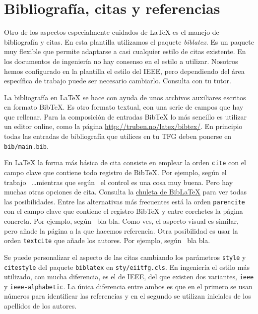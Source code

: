 \section{Bibliografía, citas y referencias} 
\label{sec:bibliografia-citas}

Otro de los aspectos especialmente cuidados de \LaTeX{} es el manejo de bibliografía y citas.  En esta plantilla utilizamos el paquete \emph{biblatex}.  Es un paquete muy flexible que permite adaptarse a casi cualquier estilo de citas existente.  En los documentos de ingeniería no hay consenso en el estilo a utilizar.  Nosotros hemos configurado en la plantilla el estilo del IEEE, pero dependiendo del área específica de trabajo puede ser necesario cambiarlo. Consulta con tu tutor.

La bibliografía en \LaTeX{} se hace con ayuda de unos archivos auxiliares escritos en formato BibTeX.  Es otro formato textual, con una serie de campos que hay que rellenar.  Para la composición de entradas BibTeX lo más sencillo es utilizar un editor online, como la página \url{http://truben.no/latex/bibtex/}.  En principio todas las entradas de bibliografía que utilices en tu TFG deben ponerse en \texttt{bib/main.bib}.

En \LaTeX{} la forma más básica de cita consiste en emplear la orden \texttt{cite} con el campo clave que contiene todo registro de BibTeX.  Por ejemplo, según el trabajo~\cite{armas2011estimation} \ldots mientras que según~\cite{castillo2010design} el control es una cosa muy buena.  Pero hay muchas otras opciones de cita.  Consulta la \href{http://tug.ctan.org/info/biblatex-cheatsheet/biblatex-cheatsheet.pdf}{chuleta de Bib\LaTeX} para ver todas las posibilidades.  Entre las alternativas más frecuentes está la orden \texttt{parencite} con el campo clave que contiene el registro BibTeX y entre corchetes la página concreta.  Por ejemplo, según~\parencite[3]{armas2011estimation} bla bla.  Como ves, el aspecto visual es similar, pero añade la página a la que hacemos referencia.  Otra posibilidad es usar la orden \texttt{textcite} que añade los autores.  Por ejemplo, según~\textcite{armas2011estimation} bla bla.

Se puede personalizar el aspecto de las citas cambiando los parámetros \texttt{style} y \texttt{citestyle} del paquete \texttt{biblatex} en \texttt{sty/eiitfg.cls}.  En ingeniería el estilo más utilizado, con mucha diferencia, es el de IEEE, del que existen dos variantes, \texttt{ieee} y \texttt{ieee-alphabetic}.  La única diferencia entre ambos es que en el primero se usan números para identificar las referencias y en el segundo se utilizan iniciales de los apellidos de los autores.

